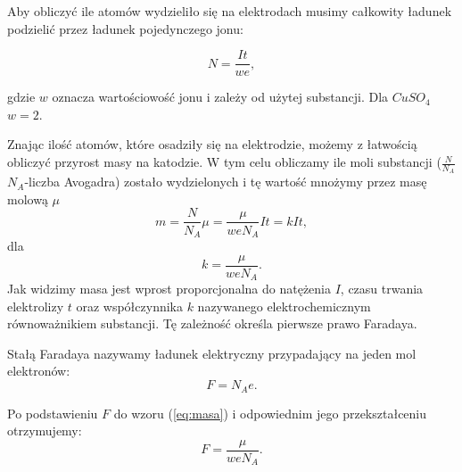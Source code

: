 \documentclass [a4paper,11pt]{article}
\begin{document}
		Aby obliczyć ile atomów wydzieliło się na elektrodach musimy całkowity ładunek podzielić przez ładunek pojedynczego jonu:
		
		\begin{equation}
		\label{eq:ilosc}
			N=\frac{It}{w e},
		\end{equation}
		
		gdzie $w$ oznacza wartościowość jonu i zależy od użytej substancji. Dla $CuSO_4$ $w=2$.

		Znając ilość atomów, które osadziły się na elektrodzie, możemy z łatwością obliczyć przyrost masy na katodzie. W tym celu obliczamy ile moli substancji ($\frac{N}{N_A}$ $N_A$-liczba Avogadra) zostało wydzielonych i tę wartość mnożymy przez masę molową $\mu$
		\begin{equation}
		\label{eq:masa}
		m=\frac{N}{N_A} \mu = \frac{\mu}{weN_A}It =kIt,		
		\end{equation}
		dla
		\begin{equation}
		\label{eq:k}
			k=\frac{\mu}{weN_A}.
		\end{equation}
		Jak widzimy masa jest wprost proporcjonalna do natężenia $I$, czasu trwania elektrolizy $t$ oraz współczynnika $k$ nazywanego elektrochemicznym równoważnikiem substancji. Tę zależność określa pierwsze prawo Faradaya.
		
		Stałą Faradaya nazywamy ładunek elektryczny przypadający na jeden mol elektronów:
			\begin{equation}
				F=N_Ae.
			\end{equation}
		
		Po podstawieniu $F$ do wzoru (\ref{eq:masa}) i odpowiednim jego przekształceniu otrzymujemy:
			\begin{equation}
				\label{eq:F}
				F=\frac{\mu}{weN_A}.
			\end{equation} 
		 
\end{document}
